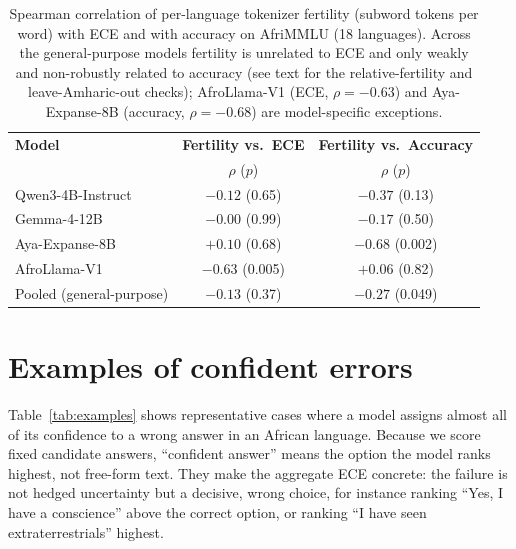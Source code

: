 \documentclass[pmlr]{jmlr}%
\begin{document}
\begin{table}[htbp]\centering\small
\caption{Spearman correlation of per-language tokenizer fertility (subword tokens per word) with ECE
and with accuracy on AfriMMLU (18 languages). Across the general-purpose models fertility is unrelated
to ECE and only weakly and non-robustly related to accuracy (see text for the relative-fertility and
leave-Amharic-out checks); AfroLlama-V1 (ECE, $\rho=-0.63$) and Aya-Expanse-8B (accuracy,
$\rho=-0.68$) are model-specific exceptions.}
\label{tab:fertility}
\begin{tabular}{lcc}
\toprule
\textbf{Model} & \textbf{Fertility vs.\ ECE} & \textbf{Fertility vs.\ Accuracy}\\
 & $\rho$ ($p$) & $\rho$ ($p$)\\
\midrule
Qwen3-4B-Instruct       & $-0.12$ (0.65) & $-0.37$ (0.13)\\
Gemma-4-12B             & $-0.00$ (0.99) & $-0.17$ (0.50)\\
Aya-Expanse-8B          & $+0.10$ (0.68) & $-0.68$ (0.002)\\
AfroLlama-V1            & $-0.63$ (0.005) & $+0.06$ (0.82)\\
\midrule
Pooled (general-purpose) & $-0.13$ (0.37) & $-0.27$ (0.049)\\
\bottomrule
\end{tabular}
\end{table}

\section{Examples of confident errors}\label{app:examples}
Table~\ref{tab:examples} shows representative cases where a model assigns almost all of its confidence
to a wrong answer in an African language. Because we score fixed candidate answers, ``confident answer''
means the option the model ranks highest, not free-form text. They make the aggregate ECE concrete: the
failure is not hedged uncertainty but a decisive, wrong choice, for instance ranking ``Yes, I have a
conscience'' above the correct option, or ranking ``I have seen extraterrestrials'' highest.
\end{document}
